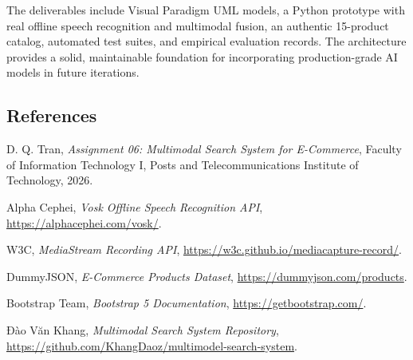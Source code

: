 \documentclass[12pt,a4paper]{article}
\begin{document}
The deliverables include Visual Paradigm UML models, a Python prototype with real offline speech recognition and multimodal fusion, an authentic 15-product catalog, automated test suites, and empirical evaluation records. The architecture provides a solid, maintainable foundation for incorporating production-grade AI models in future iterations.

\subsection*{References}
\begin{enumerate}[label={[\arabic*]}]
\item D. Q. Tran, \textit{Assignment 06: Multimodal Search System for E-Commerce}, Faculty of Information Technology I, Posts and Telecommunications Institute of Technology, 2026.
\item Alpha Cephei, \textit{Vosk Offline Speech Recognition API}, \url{https://alphacephei.com/vosk/}.
\item W3C, \textit{MediaStream Recording API}, \url{https://w3c.github.io/mediacapture-record/}.
\item DummyJSON, \textit{E-Commerce Products Dataset}, \url{https://dummyjson.com/products}.
\item Bootstrap Team, \textit{Bootstrap 5 Documentation}, \url{https://getbootstrap.com/}.
\item Đào Văn Khang, \textit{Multimodal Search System Repository}, \url{https://github.com/KhangDaoz/multimodel-search-system}.
\end{enumerate}
\end{document}
